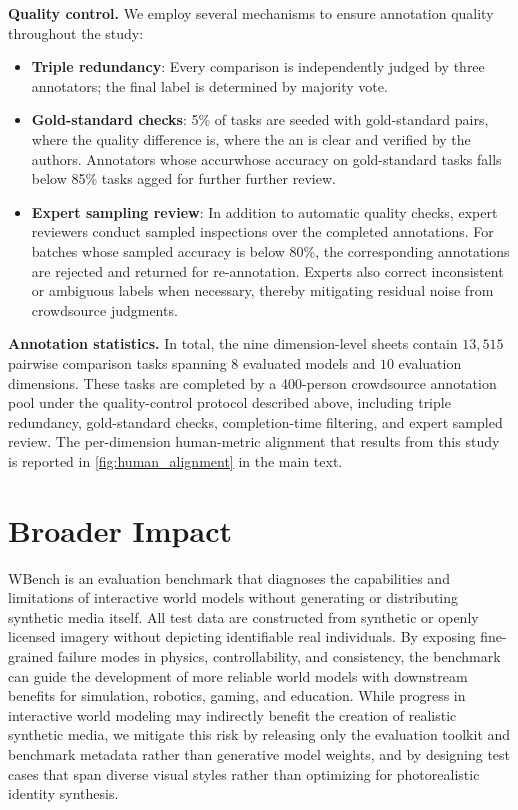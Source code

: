 \documentclass{llmxive}
\providecommand{\myparagraph}[1]{\vspace{-0.1em}\noindent\textbf{#1}\hspace{0.3em}}
\providecommand{\benchmark}{WBench }
\begin{document}
\myparagraph{Quality control.}
We employ several mechanisms to ensure annotation quality throughout the study:
\begin{itemize}[nosep,leftmargin=*]
  \item \textbf{Triple redundancy}: Every comparison is independently judged by three annotators; the final label is determined by majority vote.
  \item \textbf{Gold-standard checks}: 5\% of tasks are seeded with gold-standard pairs, where the quality difference is, where the an is clear and verified by the authors. Annotators whose accurwhose accuracy on gold-standard tasks falls below 85\% tasks agged for further further review.
  \item \textbf{Expert sampling review}: In addition to automatic quality checks, expert reviewers conduct sampled inspections over the completed annotations. For batches whose sampled accuracy is below 80\%, the corresponding annotations are rejected and returned for re-annotation. Experts also correct inconsistent or ambiguous labels when necessary, thereby mitigating residual noise from crowdsource judgments.
\end{itemize}

\myparagraph{Annotation statistics.}
In total, the nine dimension-level sheets contain $13{,}515$ pairwise comparison tasks spanning $8$ evaluated models and $10$ evaluation dimensions. These tasks are completed by a 400-person crowdsource annotation pool under the quality-control protocol described above, including triple redundancy, gold-standard checks, completion-time filtering, and expert sampled review. The per-dimension human-metric alignment that results from this study is reported in \cref{fig:human_alignment} in the main text.



\section{Broader Impact}
\label{app:broader_impact}

\benchmark is an evaluation benchmark that diagnoses the capabilities and limitations of interactive world models without generating or distributing synthetic media itself. All test data are constructed from synthetic or openly licensed imagery without depicting identifiable real individuals. By exposing fine-grained failure modes in physics, controllability, and consistency, the benchmark can guide the development of more reliable world models with downstream benefits for simulation, robotics, gaming, and education. While progress in interactive world modeling may indirectly benefit the creation of realistic synthetic media, we mitigate this risk by releasing only the evaluation toolkit and benchmark metadata rather than generative model weights, and by designing test cases that span diverse visual styles rather than optimizing for photorealistic identity synthesis.
\end{document}

